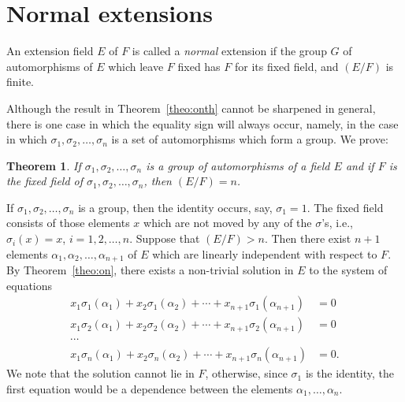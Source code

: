 \documentclass[10pt,leqno,a5paper]{book}
\newtheorem{theo}{Theorem}
\theoremstyle{definition}
\let\htw\section
\begin{document}
\htw{Normal extensions}

An extension field $E$ of $F$ is called a \emph{normal} extension if the group $G$ of automorphisms of $E$ which leave $F$ fixed has $F$ for its fixed field, and $(E/F)$ is finite.

Although the result in Theorem~\ref{theo:onth} cannot be sharpened in general, there is one case in which the equality sign will always occur, namely, in the case in which $\sigma_1, \sigma_2, \ldots, \sigma_n$ is a set of automorphisms which form a group.
We prove:

\begin{theo}
\label{theo:onfo}
If $\sigma_1, \sigma_2, \ldots, \sigma_n$ is a group of automorphisms of a field $E$ and if $F$ is the fixed field of $\sigma_1, \sigma_2, \ldots, \sigma_n$, then $(E/F) = n$.
\end{theo}

If $\sigma_1, \sigma_2, \ldots, \sigma_n$ is a group, then the identity occurs, say, $\sigma_1 = 1$.
The fixed field consists of those elements $x$ which are not moved by any of the $\sigma$'s, i.e., $\sigma_i(x) = x$, $i = 1,2,\ldots,n$.
Suppose that $(E/F) > n$.
Then there exist $n+1$ elements $\alpha_1, \alpha_2, \ldots, \alpha_{n+1}$ of $E$ which are linearly independent with respect to $F$.
By Theorem~\ref{theo:on}, there exists a non-trivial solution in $E$ to the system of equations
\begin{equation}
\tag{'}
\begin{aligned}
x_1 \sigma_1(\alpha_1) +
x_2 \sigma_1(\alpha_2) +
\cdots +
x_{n+1} \sigma_{1}(\alpha_{n+1}) &= 0
\\
x_1 \sigma_2(\alpha_1) +
x_2 \sigma_2(\alpha_2) +
\cdots +
x_{n+1} \sigma_{2}(\alpha_{n+1}) &= 0
\\
\cdots &
\\
x_1 \sigma_{n}(\alpha_1) +
x_2 \sigma_{n}(\alpha_2) +
\cdots +
x_{n+1} \sigma_{n}(\alpha_{n+1}) &= 0.
\end{aligned}
\end{equation}
We note that the solution cannot lie in $F$, otherwise, since $\sigma_1$ is the identity, the first equation would be a dependence between the elements $\alpha_1, \ldots, \alpha_n$.
\end{document}
